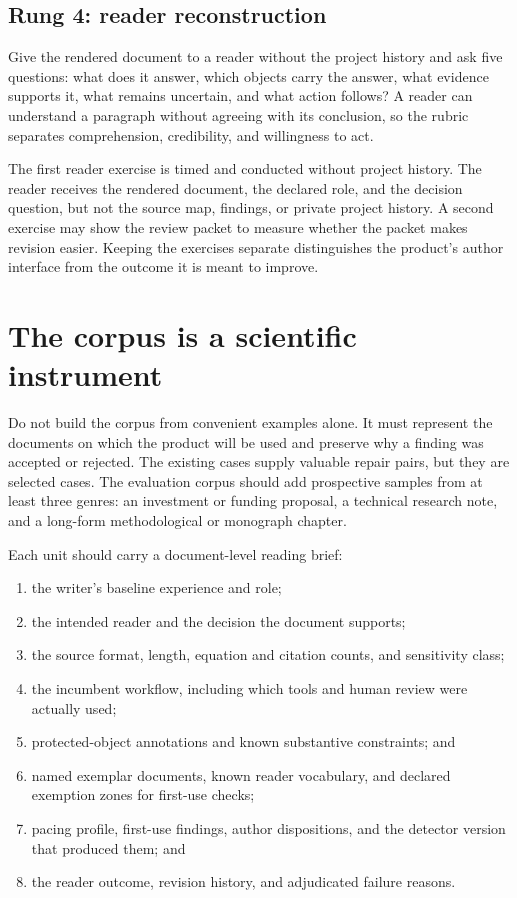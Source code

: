 \subsection{Rung 4: reader reconstruction}

Give the rendered document to a reader without the project history and ask five
questions: what does it answer, which objects carry the answer, what evidence
supports it, what remains uncertain, and what action follows? A reader can
understand a paragraph without agreeing with its conclusion, so the rubric
separates comprehension, credibility, and willingness to act.

The first reader exercise is timed and conducted without project history. The
reader receives
the rendered document, the declared role, and the decision question, but not
the source map, findings, or private project history. A second exercise may
show the review packet to measure whether the packet makes revision easier.
Keeping the exercises separate distinguishes the product's author interface
from the outcome it is meant to improve.

\section{The corpus is a scientific instrument}

Do not build the corpus from convenient examples alone. It must represent the
documents on which the product will be used and preserve why a finding was
accepted or rejected. The existing cases supply valuable repair pairs, but they
are selected cases. The evaluation corpus should add prospective samples
from at least three genres: an investment or funding proposal, a technical
research note, and a long-form methodological or monograph chapter.

Each unit should carry a document-level reading brief:

\begin{enumerate}
\item the writer's baseline experience and role;
\item the intended reader and the decision the document supports;
\item the source format, length, equation and citation counts, and sensitivity
      class;
\item the incumbent workflow, including which tools and human review were
      actually used;
\item protected-object annotations and known substantive constraints; and
\item named exemplar documents, known reader vocabulary, and declared
      exemption zones for first-use checks;
\item pacing profile, first-use findings, author dispositions, and the
      detector version that produced them; and
\item the reader outcome, revision history, and adjudicated failure reasons.
\end{enumerate}

